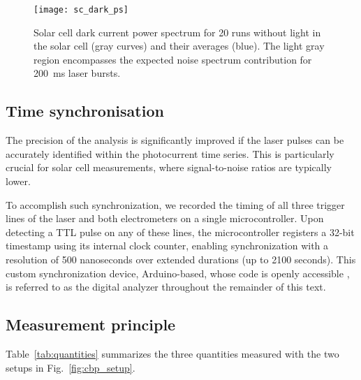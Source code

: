 \begin{figure}%
\begin{center}
\texttt{[image: sc\_dark\_ps]}
\end{center}
\caption[]{Solar cell dark current power spectrum for 20 runs without light in the solar cell (gray curves) and their averages (blue). The light gray region encompasses the expected noise spectrum contribution for \SI{200}{\ms} laser bursts.}
\label{fig:darkcurrentspectrum}
\end{figure}

\FloatBarrier   

\subsection{Time synchronisation}
\label{sec:synchro}

The precision of the analysis is significantly improved if the laser pulses can be accurately identified within the photocurrent time series. This is particularly crucial for solar cell measurements, where signal-to-noise ratios are typically lower.

To accomplish such synchronization, we recorded the timing of all three trigger lines of the laser and both electrometers on a single microcontroller. Upon detecting a TTL pulse on any of these lines, the microcontroller registers a 32-bit timestamp using its internal clock counter, enabling synchronization with a resolution of 500 nanoseconds over extended durations (up to 2100 seconds). This custom synchronization device, Arduino-based, whose code is openly accessible \cite{logic_timer}, is referred to as the digital analyzer throughout the remainder of this text.

\subsection{Measurement principle}

Table~\ref{tab:quantities} summarizes the three quantities measured with the two setups in Fig.~\ref{fig:cbp_setup}.

